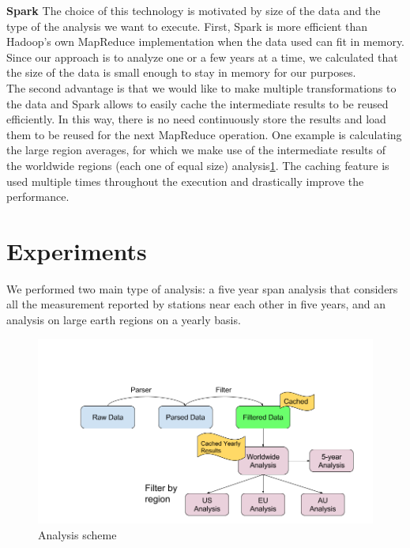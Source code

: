 \documentclass{vldb}
\begin{document}
\textbf{Spark}
The choice of this technology is motivated by size of the data and the type of the analysis we want to execute. First, Spark is more efficient than Hadoop's own MapReduce\cite{dean2008mapreduce} implementation when the data used can fit in memory. Since our approach is to analyze one or a few years at a time, we calculated that the size of the data is small enough to stay in memory for our purposes. \\
The second advantage is that we would like to make multiple transformations to the data and Spark allows to easily cache the intermediate results to be reused efficiently. In this way, there is no need continuously store the results and load them to be reused for the next MapReduce operation. One example is calculating the large region averages, for which we make use of the intermediate results of the worldwide regions (each one of equal size) analysis\ref{fig:analysis}. The caching feature is used multiple times throughout the execution and drastically improve the performance. \\


\section{Experiments}
\label{sec:exp}
We performed two main type of analysis: a five year span analysis that considers all the measurement reported by stations near each other in five years, and an analysis on large earth regions on a yearly basis. \\

\begin{figure}[tbh]
\includegraphics[width=1\linewidth]{analysis}
\caption{Analysis scheme}
\label{fig:analysis}
\end{figure}
\end{document}
